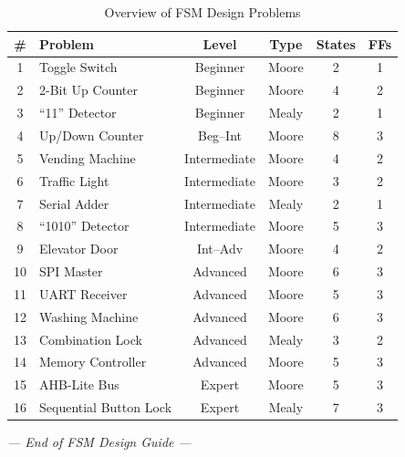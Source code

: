 \documentclass[12pt,a4paper]{article}
\begin{document}
\begin{table}[H]
\centering
\footnotesize
\caption{Overview of FSM Design Problems}
\begin{tabular}{clcccc}
\toprule
\# & \textbf{Problem} & \textbf{Level} & \textbf{Type} & \textbf{States} & \textbf{FFs} \\
\midrule
1 & Toggle Switch & Beginner & Moore & 2 & 1 \\
2 & 2-Bit Up Counter & Beginner & Moore & 4 & 2 \\
3 & ``11'' Detector & Beginner & Mealy & 2 & 1 \\
4 & Up/Down Counter & Beg--Int & Moore & 8 & 3 \\
5 & Vending Machine & Intermediate & Moore & 4 & 2 \\
6 & Traffic Light & Intermediate & Moore & 3 & 2 \\
7 & Serial Adder & Intermediate & Mealy & 2 & 1 \\
8 & ``1010'' Detector & Intermediate & Moore & 5 & 3 \\
9 & Elevator Door & Int--Adv & Moore & 4 & 2 \\
10 & SPI Master & Advanced & Moore & 6 & 3 \\
11 & UART Receiver & Advanced & Moore & 5 & 3 \\
12 & Washing Machine & Advanced & Moore & 6 & 3 \\
13 & Combination Lock & Advanced & Mealy & 3 & 2 \\
14 & Memory Controller & Advanced & Moore & 5 & 3 \\
15 & AHB-Lite Bus & Expert & Moore & 5 & 3 \\
16 & Sequential Button Lock & Expert & Mealy & 7 & 3 \\
\bottomrule
\end{tabular}
\end{table}

\vspace{1cm}
\begin{center}
\textit{--- End of FSM Design Guide ---}
\end{center}
\end{document}

